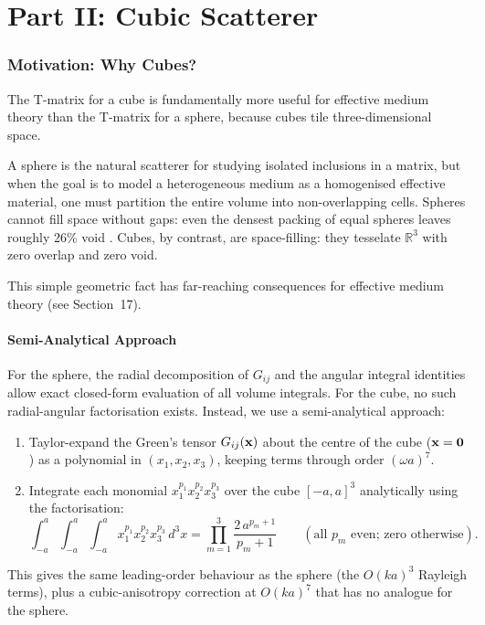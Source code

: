 
\part*{Part II: Cubic Scatterer}

\section{Motivation: Why Cubes?}

The T-matrix for a cube is fundamentally more useful for effective medium
theory than the T-matrix for a sphere, because cubes tile three-dimensional
space.

A sphere is the natural scatterer for studying isolated inclusions in a
matrix, but when the goal is to model a heterogeneous medium as a
homogenised effective material, one must partition the entire volume into
non-overlapping cells.  Spheres cannot fill space without gaps: even the
densest packing of equal spheres leaves roughly 26\% void \citep{Hales2005}.
Cubes, by contrast, are space-filling: they tesselate $\mathbb{R}^3$ with
zero overlap and zero void.

This simple geometric fact has far-reaching consequences for effective
medium theory (see Section~17).

\subsection{Semi-Analytical Approach}

For the sphere, the radial decomposition of $G_{ij}$ and the angular
integral identities allow exact closed-form evaluation of all volume
integrals.  For the cube, no such radial-angular factorisation exists.
Instead, we use a semi-analytical approach:

\begin{enumerate}
\item Taylor-expand the Green's tensor $G_{ij}(\mathbf{x})$ about the centre of
  the cube ($\mathbf{x}=\mathbf{0}$) as a polynomial in $(x_1,x_2,x_3)$, keeping
  terms through order $(\omega a)^7$.

\item Integrate each monomial $x_1^{p_1} x_2^{p_2} x_3^{p_3}$ over the
  cube $[-a,a]^3$ analytically using the factorisation:
\begin{equation}
  \int_{-a}^{a}\!\int_{-a}^{a}\!\int_{-a}^{a}
  x_1^{p_1} x_2^{p_2} x_3^{p_3}\,d^3x
  = \prod_{m=1}^{3} \frac{2\,a^{p_m+1}}{p_m+1}
  \qquad(\text{all } p_m \text{ even; zero otherwise}).
\label{eq:cubemono}
\end{equation}
\end{enumerate}
This gives the same leading-order behaviour as the sphere (the $O(ka)^3$
Rayleigh terms), plus a cubic-anisotropy correction at $O(ka)^7$ that has
no analogue for the sphere.


